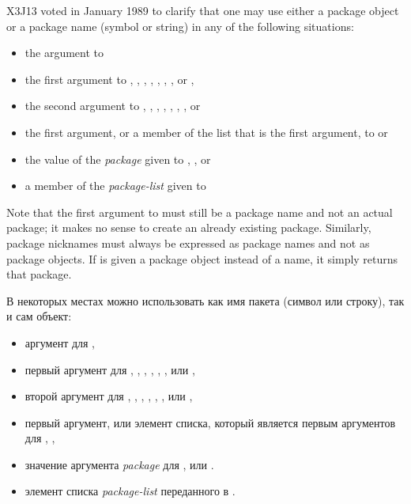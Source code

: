 \begin{new}
X3J13 voted in January 1989
to clarify that one may use either a package object or
a package name (symbol or string) in any of the following
situations:
\begin{itemize}
\item the  argument to 
\item the first argument to , ,
, ,
, ,
, or ,

\item the second argument to , ,
, , , , ,
or 
\item the first argument, or a member of the list that is the first argument,
to  or 
\item the value of the \emph{package} given to ,
, or 
\item a member of the \emph{package-list} given to 
\end{itemize}
Note that the first argument to  must still be a package
name and not an actual package; it makes no sense to create an already
existing package.  Similarly, package nicknames must always be expressed
as package names and not as package objects.  If  is
given a package object instead of a name, it simply returns that package.
\end{new}

В некоторых местах можно использовать как имя пакета (символ или
строку), так и сам объект:

\begin{itemize}
\item аргумент  для ,

\item первый аргумент для ,
  , ,
  , , ,
   или ,

\item второй аргумент для , ,
  , , , ,
   или ,

\item первый аргумент, или элемент списка, который является первым
  аргументов для , ,

\item значение аргумента \emph{package} для ,
   или .

\item элемент списка \emph{package-list} переданного в
  .
\end{itemize}

